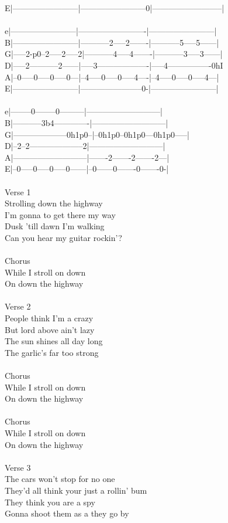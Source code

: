 {E|------------------------|------------------------0|--------------------------|\\
\\
e|------------------------|-------------------------|------------------------|\\
B|------------------------|-----------2-----2-------|-----------5-----5------|\\
G|-----2-p0--2-----2-----2|-----------4-----4-------|-----------3-----3------|\\
D|-----2-----------2------|-----3-------------------|-----4----------------0hI\\
A|--0-----0-----0-----0---|--4-----0-----0-----4----|--4-----0-----0-----4---|\\
E|------------------------|-----------------------0-|------------------------|\\
\\
e|--------0--------0---------|---------------------------|\\
B|-----------3b4-------------|---------------------------|\\
G|--------------------0h1p0--|--0h1p0--0h1p0---0h1p0-----|\\
D|--2--2--------------------2|---------------------------|\\
A|---------------------------|-------2-------2-------2---|\\
E|--0-----0-----0-----0------|--0------0-------0-------0-|\\
\\
\lbrack Verse 1\rbrack\\
Strolling down the highway\\
I'm gonna to get there my way\\
Dusk 'till dawn I'm walking\\
Can you hear my guitar rockin'?\\
\\
\lbrack Chorus\rbrack\\
While I stroll on down\\
On down the highway\\
\\
\lbrack Verse 2\rbrack\\
People think I'm a crazy\\
But lord above ain't lazy\\
The sun shines all day long\\
The garlic's far too strong\\
\\
\lbrack Chorus\rbrack\\
While I stroll on down\\
On down the highway\\
\\
\lbrack Chorus\rbrack\\
While I stroll on down\\
On down the highway\\
\\
\lbrack Verse 3\rbrack\\
The cars won't stop for no one\\
They'd all think your just a rollin' bum\\
They think you are a spy\\
Gonna shoot them as a they go by\\
}
